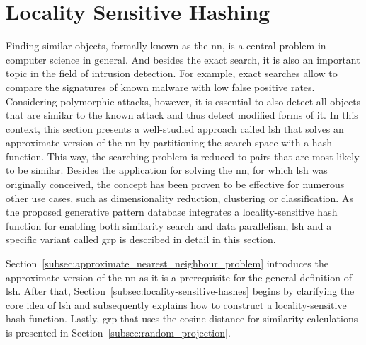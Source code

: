 \documentclass[../../../main.tex]{subfiles}
\begin{document}
\section{Locality Sensitive Hashing}\label{sec:locality_sensitive_hashing}
Finding similar objects, formally known as the \gls{nn}, is a central problem in computer science in general. And besides the exact search, it is also an important topic in the field of intrusion detection. For example, exact searches allow to compare the signatures of known malware with low false positive rates. Considering polymorphic attacks, however, it is essential to also detect all objects that are similar to the known attack and thus detect modified forms of it. In this context, this section presents a well-studied approach called \gls{lsh} that solves an approximate version of the \gls{nn} by partitioning the search space with a hash function. This way, the searching problem is reduced to pairs that are most likely to be similar. Besides the application for solving the \gls{nn}, for which \gls{lsh} was originally conceived, the concept has been proven to be effective for numerous other use cases, such as dimensionality reduction, clustering or classification. As the proposed generative pattern database integrates a locality-sensitive hash function for enabling both similarity search and data parallelism, \gls{lsh} and a specific variant called \gls{grp} is described in detail in this section.

Section~\ref{subsec:approximate_nearest_neighbour_problem} introduces the approximate version of the \gls{nn} as it is a prerequisite for the general definition of \gls{lsh}. After that, Section~\ref{subsec:locality-sensitive-hashes} begins by clarifying the core idea of \gls{lsh} and subsequently explains how to construct a locality-sensitive hash function. Lastly, \gls{grp} that uses the cosine distance for similarity calculations is presented in Section~\ref{subsec:random_projection}.






\end{document}
